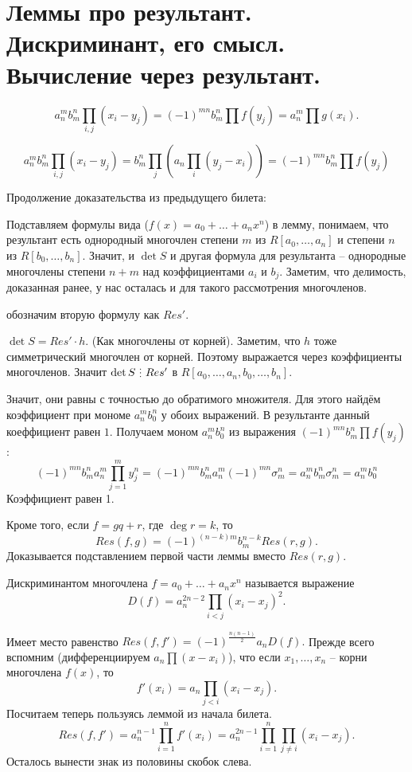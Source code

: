 \section{
 Леммы про результант. Дискриминант, его смысл. Вычисление через результант.
}

\lm  $$a_n^mb_m^n \prod_{i,j} (x_i-y_j)=(-1)^{mn}b_m^n \prod f(y_j)=a_n^m \prod g(x_i).$$ 
\elm

\proof
$$a_n^mb_m^n \prod_{i,j} (x_i-y_j) = b_m^n \prod_j (a_n \prod_i (y_j - x_i)) = (-1)^{mn}b_m^n \prod f(y_j)$$
\endproof

Продолжение доказательства из предыдущего билета:

Подставляем формулы вида ($f(x)=a_0+\dots+a_nx^n$) в лемму, понимаем, что результант есть однородный многочлен степени $m$ из $R[a_0, \ldots, a_n]$ и степени $n$ из
$R[b_0, \ldots, b_n]$. Значит, и $\det S$ и другая формула для результанта -- однородные многочлены степени $n+m$ над коэффициентами $a_i$ и $b_j$. 
Заметим, что делимость, доказанная ранее, у нас осталась и для такого рассмотрения многочленов.

\proof обозначим вторую формулу как $Res'$.

$\det S = Res' \cdot h$. (Как многочлены от корней). Заметим, что $h$ тоже симметрический многочлен от корней. Поэтому выражается через коэффициенты многочленов.
Значит $\det S \di Res'$ в $R[a_0, \ldots, a_n, b_0, \ldots, b_n]$.
\endproof

Значит, они равны с точностью до обратимого множителя. Для этого найдём коэффициент при мономе $a_n^m b_0^n$ у обоих выражений. 
В результанте данный коеффициент равен $1$. Получаем моном $a_n^m b_0^n$ из выражения $(-1)^{mn}b_m^n \prod f(y_j)$:
$$(-1)^{mn}b_m^n a_n^m \prod_{j=1}^m y_j^n = (-1)^{mn} b_m^n a_n^m (-1)^{mn} \sigma_m^n = a_n^m b_m^n \sigma_m^n = a_n^m b_0^n$$
Коэффициент равен 1.

\hfill
\hfill

\bupr Кроме того, если $f=gq+r$, где $\deg r=k$, то 
 $$Res(f,g)=(-1)^{(n-k)m}b_m^{n-k} Res(r,g).$$
 \proof
    Доказывается подставлением первой части леммы вместо $Res(r, g)$.
 \endproof
 \eupr

\dfn Дискриминантом многочлена $f=a_0+\dots +a_nx^n$ называется выражение 
$$D(f)=a_n^{2n-2}\prod_{i < j} (x_i-x_j)^2.$$
\edfn

\lm Имеет место равенство $Res(f,f')=(-1)^{\frac{n(n-1)}{2}} a_n D(f).$
\proof Прежде всего вспомним (дифференциируем $a_n \prod (x - x_i)$), что если $x_1,\dots,x_n$ -- корни многочлена $f(x)$, то $$f'(x_i)=a_n\prod_{j < i}(x_i-x_j).$$
Посчитаем теперь пользуясь леммой из начала билета.
$$Res(f,f')= a_n^{n-1}\prod_{i=1}^n f'(x_i)=a_n^{2n-1} \prod_{i=1}^n \prod_{j\neq i} (x_i-x_j).$$
Осталось вынести знак из половины скобок слева.
\endproof
\elm

